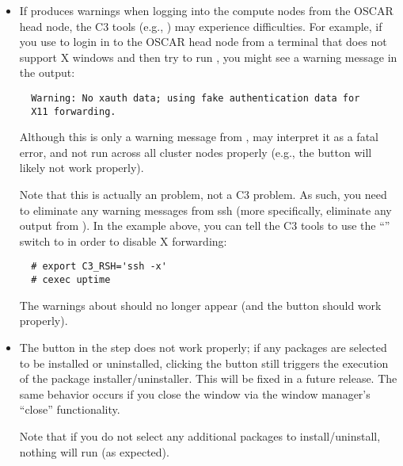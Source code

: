 \begin{itemize}
\begchange
\item If  produces warnings when logging into the compute
  nodes from the OSCAR head node, the C3 tools (e.g., ) may
  experience difficulties.  For example, if you use  to login
  in to the OSCAR head node from a terminal that does not support X
  windows and then try to run , you might see a warning
  message in the  output:

\begin{verbatim}
  Warning: No xauth data; using fake authentication data for 
  X11 forwarding.
\end{verbatim}
  
  Although this is only a warning message from , 
  may interpret it as a fatal error, and not run across all cluster
  nodes properly (e.g., the  button
  will likely not work properly).

  Note that this is actually an  problem, not a C3 problem.
  As such, you need to eliminate any warning messages from ssh (more
  specifically, eliminate any output from ).  In the
  example above, you can tell the C3 tools to use the ``''
  switch to  in order to disable X forwarding:

\begin{verbatim}
  # export C3_RSH='ssh -x'
  # cexec uptime
\end{verbatim}
  
  The warnings about  should no longer appear (and the
   button should work properly).
  
\item The  button in the  step does not work properly; if any packages are selected
  to be installed or uninstalled, clicking the  button
  still triggers the execution of the package installer/uninstaller.
  This will be fixed in a future release.  The same behavior occurs if
  you close the window via the window manager's ``close''
  functionality.

  Note that if you do not select any additional packages to
  install/uninstall, nothing will run (as expected).

\endchange

\end{itemize}


